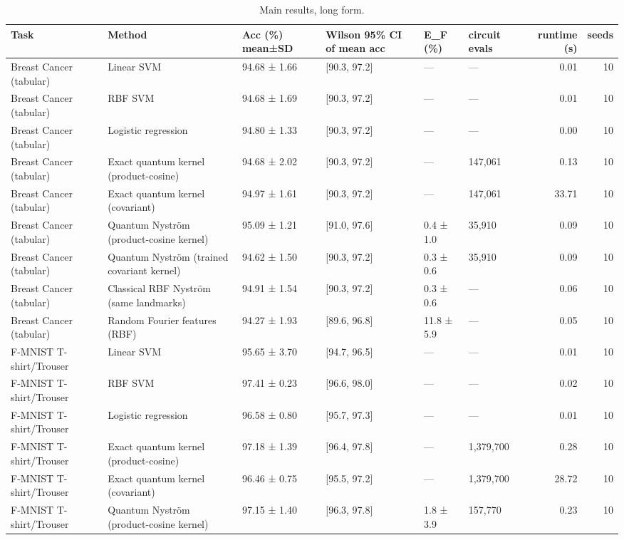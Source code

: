 \begin{table}
\caption{Main results, long form.}
\label{tab:table2_main_long}
\begin{tabular}{llllllrr}
\toprule
Task & Method & Acc (\%) mean±SD & Wilson 95\% CI of mean acc & E\_F (\%) & circuit evals & runtime (s) & seeds \\
\midrule
Breast Cancer (tabular) & Linear SVM & 94.68 ± 1.66 & [90.3, 97.2] & — & — & 0.01 & 10 \\
Breast Cancer (tabular) & RBF SVM & 94.68 ± 1.69 & [90.3, 97.2] & — & — & 0.01 & 10 \\
Breast Cancer (tabular) & Logistic regression & 94.80 ± 1.33 & [90.3, 97.2] & — & — & 0.00 & 10 \\
Breast Cancer (tabular) & Exact quantum kernel (product-cosine) & 94.68 ± 2.02 & [90.3, 97.2] & — & 147,061 & 0.13 & 10 \\
Breast Cancer (tabular) & Exact quantum kernel (covariant) & 94.97 ± 1.61 & [90.3, 97.2] & — & 147,061 & 33.71 & 10 \\
Breast Cancer (tabular) & Quantum Nyström (product-cosine kernel) & 95.09 ± 1.21 & [91.0, 97.6] & 0.4 ± 1.0 & 35,910 & 0.09 & 10 \\
Breast Cancer (tabular) & Quantum Nyström (trained covariant kernel) & 94.62 ± 1.50 & [90.3, 97.2] & 0.3 ± 0.6 & 35,910 & 0.09 & 10 \\
Breast Cancer (tabular) & Classical RBF Nyström (same landmarks) & 94.91 ± 1.54 & [90.3, 97.2] & 0.3 ± 0.6 & — & 0.06 & 10 \\
Breast Cancer (tabular) & Random Fourier features (RBF) & 94.27 ± 1.93 & [89.6, 96.8] & 11.8 ± 5.9 & — & 0.05 & 10 \\
F-MNIST T-shirt/Trouser & Linear SVM & 95.65 ± 3.70 & [94.7, 96.5] & — & — & 0.01 & 10 \\
F-MNIST T-shirt/Trouser & RBF SVM & 97.41 ± 0.23 & [96.6, 98.0] & — & — & 0.02 & 10 \\
F-MNIST T-shirt/Trouser & Logistic regression & 96.58 ± 0.80 & [95.7, 97.3] & — & — & 0.01 & 10 \\
F-MNIST T-shirt/Trouser & Exact quantum kernel (product-cosine) & 97.18 ± 1.39 & [96.4, 97.8] & — & 1,379,700 & 0.28 & 10 \\
F-MNIST T-shirt/Trouser & Exact quantum kernel (covariant) & 96.46 ± 0.75 & [95.5, 97.2] & — & 1,379,700 & 28.72 & 10 \\
F-MNIST T-shirt/Trouser & Quantum Nyström (product-cosine kernel) & 97.15 ± 1.40 & [96.3, 97.8] & 1.8 ± 3.9 & 157,770 & 0.23 & 10 \\

\end{tabular}
\end{table}
